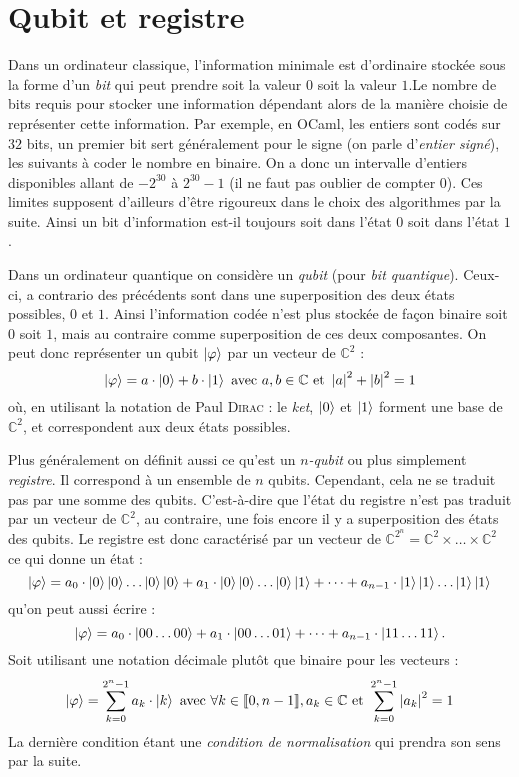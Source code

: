 \documentclass[a4paper,11pt]{tipe}
\newcommand{\abs}[1]{\left| #1 \right|}
\newcommand{\C}{\ensuremath{\mathbb{C}}}
\newcommand{\intEntier}[1]{\ensuremath{\llbracket #1 \rrbracket}}
\begin{document}
\section{Qubit et registre}
Dans un ordinateur classique, l'information minimale est d'ordinaire stockée
sous la forme d'un \emph{bit} qui peut prendre soit la valeur $0$ soit la
valeur $1$.Le nombre de bits requis pour stocker une information dépendant alors
de la manière choisie de représenter cette information. Par exemple, en OCaml,
les entiers sont codés sur $32$ bits, un premier bit sert généralement pour le
signe (on parle d'\emph{entier signé}), les suivants à coder le nombre en
binaire. On a donc un intervalle d'entiers disponibles allant de $-2^{30}$ à
$2^{30} - 1$ (il ne faut pas oublier de compter $0$). Ces limites supposent
d'ailleurs d'être rigoureux dans le choix des algorithmes par la suite. Ainsi un
bit d'information est-il toujours soit dans l'état $0$ soit dans l'état $1$.

Dans un ordinateur quantique on considère un \emph{qubit} (pour \emph{bit
quantique}). Ceux-ci, a contrario des précédents sont dans une superposition
des deux états possibles, $0$ et $1$. Ainsi l'information codée n'est plus
stockée de façon binaire soit $0$ soit $1$, mais au contraire comme
superposition de ces deux composantes. On peut donc représenter un qubit
$\ket \varphi$ par un vecteur de $\C^2$ :
\[ \ket \varphi = a \cdot \ket 0 + b \cdot \ket 1 \text{ avec } a,b\in\C \text{
et } \abs a
^2 + \abs b ^2 = 1 \]
où, en utilisant la notation de Paul \textsc{Dirac} : le \emph{ket}, $\ket 0$ et
$\ket 1$ forment une base de $\C^2$, et correspondent aux deux états possibles. 

Plus généralement on définit aussi ce qu'est un \emph{$n$-qubit} ou plus
simplement \emph{registre}. Il correspond à un ensemble de $n$ qubits.
Cependant, cela ne se traduit pas par une somme des qubits. C'est-à-dire que
l'état du registre n'est pas traduit par un vecteur de $\C^2$, au contraire,
une fois encore il y a superposition des états des qubits. Le registre est donc
caractérisé par un vecteur de $\C^{2^n} = \C^2 \times \dots \times \C^2$ ce qui
donne un état :
\[ \ket\varphi = a_0 \cdot \ket 0 \ket 0 \dots \ket 0 \ket 0
    + a_1 \cdot \ket 0 \ket 0 \dots \ket 0 \ket 1 
    + \dots + a_{n-1} \cdot \ket 1 \ket 1\dots \ket 1 \ket 1 \]
qu'on peut aussi écrire :
\[ \ket\varphi = a_0 \cdot \ket{00\dots00}
    + a_1 \cdot \ket{00\dots01} + \dots 
    + a_{n-1} \cdot\ket{11\dots11} .\]
Soit utilisant une notation décimale plutôt que binaire pour les vecteurs :
\[\ket\varphi = \sum_{k=0}^{2^n-1} a_k \cdot \ket {k} \text{ avec } \forall k
\in \intEntier{0,n-1} , a_k \in\C \text{ et } \sum_{k=0}^{2^n-1} \abs{a_k} ^2 =
1 \]
La dernière condition étant une \emph{condition de normalisation} qui prendra
son sens par la suite.
\end{document}
